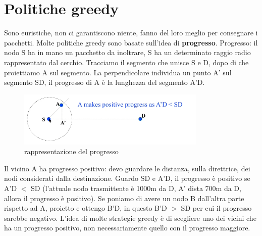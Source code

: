 \documentclass[12pt,italian]{report}
\begin{document}
\section{Politiche greedy}
Sono euristiche, non ci garantiscono niente, fanno del loro meglio per consegnare i pacchetti. Molte politiche greedy sono basate sull'idea di \textbf{progresso}.
\bigbreak
\noindent Progresso: il nodo S ha in mano un pacchetto da inoltrare, S ha un determinato raggio radio rappresentato dal cerchio. Tracciamo il segmento che unisce S e D, dopo di che proiettiamo A sul segmento. La perpendicolare individua un punto A' sul segmento SD, il progresso di A è la lunghezza del segmento A'D. 
\begin{figure}[h]
\centering
\includegraphics[width=90mm]{img/progress.PNG}
\caption{rappresentazione del progresso}
\label{fig:pseuopefre}
\end{figure}
\bigbreak
Il vicino A ha progresso positivo: devo guardare le distanza, sulla direttrice, dei nodi considerati dalla destinazione. Guardo SD e A'D, il progresso è positivo se A'D $<$ SD (l'attuale nodo trasmittente è 1000m da D, A' dista 700m da D, allora il progresso è positivo). Se poniamo di avere un nodo B dall'altra parte rispetto ad A, proietto e ottengo B'D, in questo B'D $>$ SD per cui il progresso sarebbe negativo. 
\bigbreak
L'idea  di molte strategie greedy è di scegliere uno dei vicini che ha un progresso positivo, non necessariamente quello con il progresso maggiore. 
\end{document}
